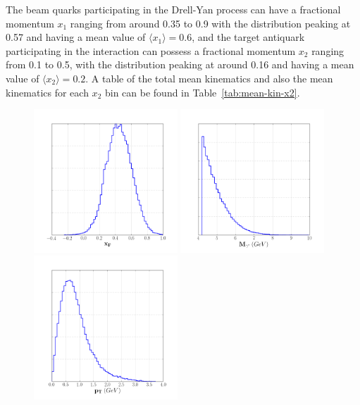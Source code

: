 The beam quarks participating in the Drell-Yan process can have a fractional momentum $x_1$ ranging from around 0.35 to 0.9 with the distribution peaking at 0.57 and having a mean value of $\langle x_1 \rangle = 0.6$, and the target antiquark participating in the interaction can possess a fractional momentum $x_2$ ranging from 0.1 to 0.5, with the distribution peaking at around 0.16 and having a mean value of $\langle x_2 \rangle = 0.2$. A table of the total mean kinematics and also the mean kinematics for each $x_2$ bin can be found in Table~\ref{tab:mean-kin-x2}.

\begin{figure}
	\centering
	\includegraphics[width=0.48\textwidth]{figures/results/xF-dist.png} \hfill
	\includegraphics[width=0.48\textwidth]{figures/results/mass-dist.png}	
	\includegraphics[width=0.48\textwidth]{figures/results/pt-dist.png} \hfill

\end{figure}
